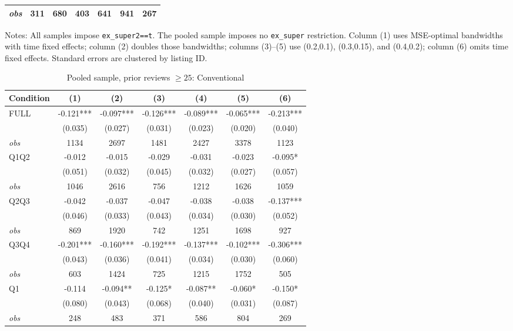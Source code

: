 \begin{table}[!htbp]
\begin{tabular}{lcccccc}
\textit{obs} & 311 & 680 & 403 & 641 & 941 & 267 \\
\bottomrule
\end{tabular}
\begin{minipage}{0.98\textwidth}\footnotesize
Notes: All samples impose \texttt{ex\_super2==t}. The pooled sample imposes no \texttt{ex\_super} restriction. Column (1) uses MSE-optimal bandwidths with time fixed effects; column (2) doubles those bandwidths; columns (3)--(5) use (0.2,0.1), (0.3,0.15), and (0.4,0.2); column (6) omits time fixed effects. Standard errors are clustered by listing ID.
\end{minipage}
\end{table}

\begin{table}[!htbp]
\centering
\caption{Pooled sample, prior reviews $\geq25$: Conventional}
\begin{tabular}{lcccccc}
\toprule
Condition & (1) & (2) & (3) & (4) & (5) & (6) \\
\midrule
FULL & -0.121*** & -0.097*** & -0.126*** & -0.089*** & -0.065*** & -0.213*** \\
 & (0.035) & (0.027) & (0.031) & (0.023) & (0.020) & (0.040) \\
\textit{obs} & 1134 & 2697 & 1481 & 2427 & 3378 & 1123 \\
Q1Q2 & -0.012 & -0.015 & -0.029 & -0.031 & -0.023 & -0.095* \\
 & (0.051) & (0.032) & (0.045) & (0.032) & (0.027) & (0.057) \\
\textit{obs} & 1046 & 2616 & 756 & 1212 & 1626 & 1059 \\
Q2Q3 & -0.042 & -0.037 & -0.047 & -0.038 & -0.038 & -0.137*** \\
 & (0.046) & (0.033) & (0.043) & (0.034) & (0.030) & (0.052) \\
\textit{obs} & 869 & 1920 & 742 & 1251 & 1698 & 927 \\
Q3Q4 & -0.201*** & -0.160*** & -0.192*** & -0.137*** & -0.102*** & -0.306*** \\
 & (0.043) & (0.036) & (0.041) & (0.034) & (0.030) & (0.060) \\
\textit{obs} & 603 & 1424 & 725 & 1215 & 1752 & 505 \\
Q1 & -0.114 & -0.094** & -0.125* & -0.087** & -0.060* & -0.150* \\
 & (0.080) & (0.043) & (0.068) & (0.040) & (0.031) & (0.087) \\
\textit{obs} & 248 & 483 & 371 & 586 & 804 & 269 \\

\end{tabular}
\end{table}
